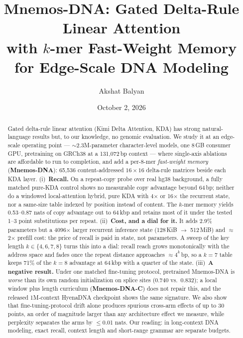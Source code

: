 \documentclass[11pt]{article}
\title{\bfseries Mnemos-DNA: Gated Delta-Rule Linear Attention\\
with $k$-mer Fast-Weight Memory for Edge-Scale DNA Modeling}
\author{Akshat Balyan}
\date{October 2, 2026}
\theoremstyle{plain}
\begin{document}
\maketitle

\begingroup
\renewcommand\thefootnote{}\endgroup

\begin{abstract}
Gated delta-rule linear attention (Kimi Delta Attention, KDA) has strong natural-language results
but, to our knowledge, no genomic evaluation. We study it at an edge-scale operating point ---
$\sim$2.3M-parameter character-level models, one 8\,GB consumer GPU, pretraining on GRCh38 at a
131{,}072\,bp context --- where single-axis ablations are affordable to run to completion, and add
a per-8-mer \emph{fast-weight memory} (\textbf{Mnemos-DNA}): 65{,}536 content-addressed
$16\times16$ delta-rule matrices beside each KDA layer.
(i)~\textbf{Recall.} On a repeat-copy probe over real hg38 background, a fully matched pure-KDA
control shows no measurable copy advantage beyond 64\,bp; neither do a windowed local-attention
hybrid, pure KDA with 4$\times$ or 16$\times$ the recurrent state, nor a same-size table indexed by
position instead of content. The $k$-mer memory yields 0.53--0.87 nats of copy advantage out to
64\,kbp and retains most of it under the tested 1--3 point substitutions per repeat.
(ii)~\textbf{Cost, and a dial for it.} It adds 2.9\% parameters but a 4096$\times$ larger
recurrent inference state (128\,KiB $\to$ 512\,MiB) and $\approx$2$\times$ prefill cost: the
price of recall is paid in state, not parameters. A sweep of the key length
$k\in\{4,6,7,8\}$ turns this into a dial: recall reach grows monotonically with the address
space and fades once the repeat distance approaches $\approx4^k$\,bp, so a $k{=}7$ table keeps
71\% of the $k{=}8$ advantage at 64\,kbp with a quarter of the state.
(iii)~\textbf{A negative result.} Under one matched fine-tuning protocol, pretrained Mnemos-DNA is
\emph{worse} than its own random initialization on splice sites (0.740 vs.\ 0.832); a local
window plus length curriculum (\textbf{Mnemos-DNA-C}) does not repair this, and the released
1M-context HyenaDNA checkpoint shows the same signature.
We also show that fine-tuning-protocol drift alone produces spurious cross-arm effects of up to
30 points, an order of magnitude larger than any architecture effect we measure, while
perplexity separates the arms by $\le$0.01 nats. Our reading: in long-context DNA modeling,
exact recall, context length and short-range grammar are separate budgets.
\end{abstract}
\end{document}
